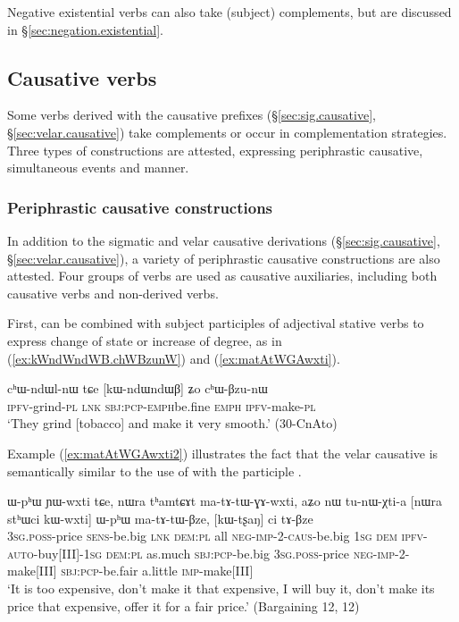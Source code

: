 Negative existential verbs can also take (subject) complements, but are discussed in §\ref{sec:negation.existential}. 

\subsection{Causative verbs}
 
Some verbs derived with the causative prefixes (§\ref{sec:sig.causative}, §\ref{sec:velar.causative}) take complements or occur in complementation strategies. Three types of constructions are attested, expressing periphrastic causative, simultaneous events and manner.

\subsubsection{Periphrastic causative constructions} \label{sec:sWpa.sABzu}
In addition to the sigmatic and velar causative derivations (§\ref{sec:sig.causative}, §\ref{sec:velar.causative}), a variety of periphrastic causative constructions are also attested. Four groups of verbs are used as causative auxiliaries, including both causative verbs and non-derived verbs.

First,  can be combined with subject participles of adjectival stative verbs to express change of state or increase of degree, as in (\ref{ex:kWndWndWB.chWBzunW}) and (\ref{ex:matAtWGAwxti}).

\begin{exe}
\ex  \label{ex:kWndWndWB.chWBzunW}
\gll cʰɯ-ndɯl-nɯ tɕe [kɯ-ndɯ\redp{}ndɯβ] ʑo cʰɯ-βzu-nɯ \\
\textsc{ipfv}-grind-\textsc{pl} \textsc{lnk} \textsc{sbj}:\textsc{pcp}-\textsc{emph}\redp{}be.fine \textsc{emph} \textsc{ipfv}-make-\textsc{pl} \\
\glt `They grind [tobacco] and make it very smooth.' (30-CnAto)
\end{exe}

Example (\ref{ex:matAtWGAwxti2}) illustrates the fact that the velar causative  is semantically similar to the use of  with the participle .

\begin{exe}
\ex  \label{ex:matAtWGAwxti2}
\gll  ɯ-pʰɯ ɲɯ-wxti tɕe, nɯra tʰamtɕɤt ma-tɤ-tɯ-ɣɤ-wxti, aʑo nɯ tu-nɯ-χti-a [nɯra stʰɯci kɯ-wxti] ɯ-pʰɯ ma-tɤ-tɯ-βze, [kɯ-tʂaŋ] ci tɤ-βze \\
   \textsc{3sg}.\textsc{poss}-price \textsc{sens}-be.big \textsc{lnk} \textsc{dem}:\textsc{pl} all \textsc{neg}-\textsc{imp}-2-\textsc{caus}-be.big \textsc{1sg} \textsc{dem} \textsc{ipfv}-\textsc{auto}-buy[III]-\textsc{1sg}   \textsc{dem}:\textsc{pl} as.much \textsc{sbj}:\textsc{pcp}-be.big \textsc{3sg}.\textsc{poss}-price \textsc{neg}-\textsc{imp}-2-make[III] \textsc{sbj}:\textsc{pcp}-be.fair a.little \textsc{imp}-make[III] \\
\glt `It is too expensive, don't make it that expensive, I will buy it, don't make its price that expensive, offer it for a fair price.' (Bargaining 12,  12)
\end{exe}

